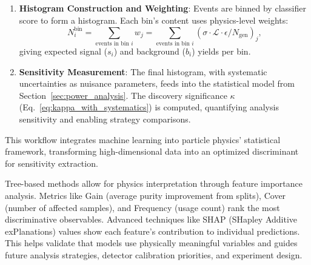 \begin{enumerate}
    \item \textbf{Histogram Construction and Weighting}: Events are binned by classifier score to form a histogram. Each bin's content uses physics-level weights:
    \[
    N_i^{\text{bin}} = \sum_{\text{events in bin } i} w_j = \sum_{\text{events in bin } i} \left( \sigma \cdot \mathcal{L} \cdot \epsilon / N_{\text{gen}} \right)_j,
    \]
    giving expected signal ($s_i$) and background ($b_i$) yields per bin.
    
    \item \textbf{Sensitivity Measurement}: The final histogram, with systematic uncertainties as nuisance parameters, feeds into the statistical model from Section~\ref{sec:power_analysis}. The discovery significance $\kappa$ (Eq.~\ref{eq:kappa_with_systematics}) is computed, quantifying analysis sensitivity and enabling strategy comparisons.
\end{enumerate}

This workflow integrates machine learning into particle physics' statistical framework, transforming high-dimensional data into an optimized discriminant for sensitivity extraction.


Tree-based methods allow for physics interpretation through feature importance analysis. Metrics like Gain (average purity improvement from splits), Cover (number of affected samples), and Frequency (usage count) rank the most discriminative observables. Advanced techniques like SHAP (SHapley Additive exPlanations) values show each feature's contribution to individual predictions. This helps validate that models use physically meaningful variables and guides future analysis strategies, detector calibration priorities, and experiment design.
